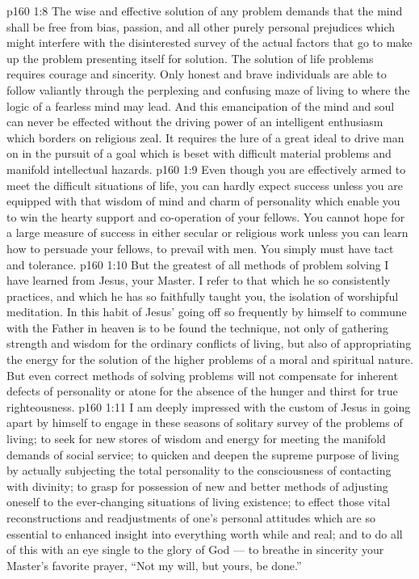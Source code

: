 \vs p160 1:8 The wise and effective solution of any problem demands that the mind shall be free from bias, passion, and all other purely personal prejudices which might interfere with the disinterested survey of the actual factors that go to make up the problem presenting itself for solution. The solution of life problems requires courage and sincerity. Only honest and brave individuals are able to follow valiantly through the perplexing and confusing maze of living to where the logic of a fearless mind may lead. And this emancipation of the mind and soul can never be effected without the driving power of an intelligent enthusiasm which borders on religious zeal. It requires the lure of a great ideal to drive man on in the pursuit of a goal which is beset with difficult material problems and manifold intellectual hazards.
\vs p160 1:9 Even though you are effectively armed to meet the difficult situations of life, you can hardly expect success unless you are equipped with that wisdom of mind and charm of personality which enable you to win the hearty support and co\hyp{}operation of your fellows. You cannot hope for a large measure of success in either secular or religious work unless you can learn how to persuade your fellows, to prevail with men. You simply must have tact and tolerance.
\vs p160 1:10 \pc But the greatest of all methods of problem solving I have learned from Jesus, your Master. I refer to that which he so consistently practices, and which he has so faithfully taught you, the isolation of worshipful meditation. In this habit of Jesus’ going off so frequently by himself to commune with the Father in heaven is to be found the technique, not only of gathering strength and wisdom for the ordinary conflicts of living, but also of appropriating the energy for the solution of the higher problems of a moral and spiritual nature. But even correct methods of solving problems will not compensate for inherent defects of personality or atone for the absence of the hunger and thirst for true righteousness.
\vs p160 1:11 I am deeply impressed with the custom of Jesus in going apart by himself to engage in these seasons of solitary survey of the problems of living; to seek for new stores of wisdom and energy for meeting the manifold demands of social service; to quicken and deepen the supreme purpose of living by actually subjecting the total personality to the consciousness of contacting with divinity; to grasp for possession of new and better methods of adjusting oneself to the ever\hyp{}changing situations of living existence; to effect those vital reconstructions and readjustments of one’s personal attitudes which are so essential to enhanced insight into everything worth while and real; and to do all of this with an eye single to the glory of God --- to breathe in sincerity your Master’s favorite prayer, \textcolor{ubdarkred}{“Not my will, but yours, be done.”}
